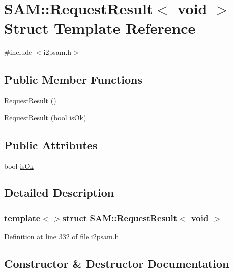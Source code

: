 \hypertarget{struct_s_a_m_1_1_request_result_3_01void_01_4}{}\section{S\+A\+M\+:\+:Request\+Result$<$ void $>$ Struct Template Reference}
\label{struct_s_a_m_1_1_request_result_3_01void_01_4}


{\ttfamily \#include $<$i2psam.\+h$>$}

\subsection*{Public Member Functions}
\begin{DoxyCompactItemize}
\item 
\hyperlink{struct_s_a_m_1_1_request_result_3_01void_01_4_a021253c7232689849eec10d19944aa34}{Request\+Result} ()
\item 
\hyperlink{struct_s_a_m_1_1_request_result_3_01void_01_4_a8e56e7456a4d10bd2ba6b840141c306b}{Request\+Result} (bool \hyperlink{struct_s_a_m_1_1_request_result_3_01void_01_4_ac648e35839394bb89010ea5513a0ea00}{is\+Ok})
\end{DoxyCompactItemize}
\subsection*{Public Attributes}
\begin{DoxyCompactItemize}
\item 
bool \hyperlink{struct_s_a_m_1_1_request_result_3_01void_01_4_ac648e35839394bb89010ea5513a0ea00}{is\+Ok}
\end{DoxyCompactItemize}


\subsection{Detailed Description}
\subsubsection*{template$<$$>$struct S\+A\+M\+::\+Request\+Result$<$ void $>$}



Definition at line 332 of file i2psam.\+h.



\subsection{Constructor \& Destructor Documentation}
\hypertarget{struct_s_a_m_1_1_request_result_3_01void_01_4_a021253c7232689849eec10d19944aa34}{}
